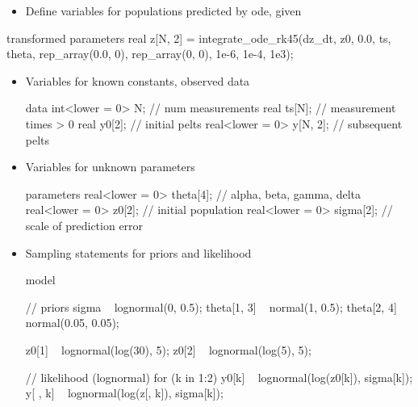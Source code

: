 \documentclass[10pt]{report}
\begin{document}
%
\begin{itemize}
\item Define variables for populations predicted by ode, given
\end{itemize}
{\small
\begin{stancode}
transformed parameters {
  real z[N, 2]
    = integrate_ode_rk45(dz_dt, z0, 0.0, ts, theta,
                         rep_array(0.0, 0), rep_array(0, 0),
                         1e-6, 1e-4, 1e3);
}
\end{stancode}
}

\begin{itemize}
\item Variables for known constants, observed data
{\footnotesize
\begin{stancode}
data {
  int<lower = 0> N;         // num measurements
  real ts[N];               // measurement times > 0
  real y0[2];               // initial pelts
  real<lower = 0> y[N, 2];  // subsequent pelts
}
\end{stancode}
}
\item Variables for unknown parameters
{\footnotesize
\begin{stancode}
parameters {
  real<lower = 0> theta[4];  // alpha, beta, gamma, delta
  real<lower = 0> z0[2];     // initial population
  real<lower = 0> sigma[2];  // scale of prediction error
}
\end{stancode}
}
\end{itemize}

%
\vspace*{-6pt}
\begin{itemize}
\item Sampling statements for priors and likelihood
\begin{stancode}
model {
  // priors
  sigma ~ lognormal(0, 0.5);
  theta[{1, 3}] ~ normal(1, 0.5);
  theta[{2, 4}] ~ normal(0.05, 0.05);

  z0[1] ~ lognormal(log(30), 5);
  z0[2] ~ lognormal(log(5), 5);

  // likelihood (lognormal)
  for (k in 1:2) {
    y0[k] ~ lognormal(log(z0[k]), sigma[k]);
    y[ , k] ~ lognormal(log(z[, k]), sigma[k]);
  }
}
\end{stancode}
\end{itemize}
\end{document}
